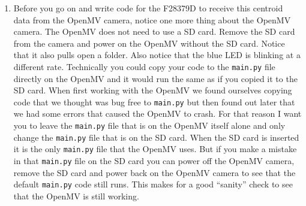 \documentclass[11pt]{article}
\begin{document}
\begin{enumerate}
    \item Before you go on and write code for the F28379D to receive this centroid data from the OpenMV camera, notice one more thing about the OpenMV camera. The OpenMV does not need to use a SD card. Remove the SD card from the camera and power on the OpenMV without the SD card. Notice that it also pulls open a folder. Also notice that the blue LED is blinking at a different rate. Technically you could copy your code to the \texttt{main.py} file directly on the OpenMV and it would run the same as if you copied it to the SD card. When first working with the OpenMV we found ourselves copying code that we thought was bug free to \texttt{main.py} but then found out later that we had some errors that caused the OpenMV to crash. For that reason I want you to leave the \texttt{main.py} file that is on the OpenMV itself alone and only change the \texttt{main.py} file that is on the SD card. When the SD card is inserted it is the only \texttt{main.py} file that the OpenMV uses. But if you make a mistake in that \texttt{main.py} file on the SD card you can power off the OpenMV camera, remove the SD card and power back on the OpenMV camera to see that the default \texttt{main.py} code still runs. This makes for a good “sanity” check to see that the OpenMV is still working.
\end{enumerate}
%
\end{document}
